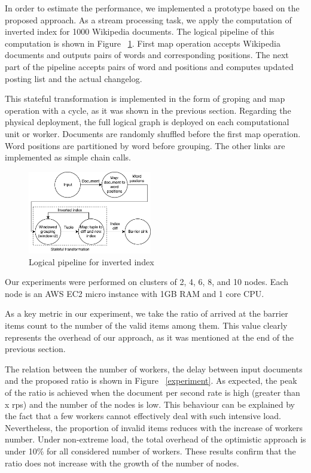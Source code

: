 
\label {fs-experiments}

In order to estimate the performance, we implemented a prototype based on the proposed approach. As a stream processing task, we apply the computation of inverted index for 1000 Wikipedia documents. The logical pipeline of this computation is shown in Figure ~\ref{inverted-index}. First map operation accepts Wikipedia documents and outputs pairs of words and corresponding positions. The next part of the pipeline accepts pairs of word and positions and computes updated posting list and the actual changelog. 

This stateful transformation is implemented in the form of groping and map operation with a cycle, as it was shown in the previous section. Regarding the physical deployment, the full logical graph is deployed on each computational unit or worker. Documents are randomly shuffled before the first map operation. Word positions are partitioned by word before grouping. The other links are implemented as simple chain calls.

\begin{figure}[htbp]
  \centering
  \includegraphics[width=0.48\textwidth]{pics/inverted-index}
  \caption{Logical pipeline for inverted index}
  \label {inverted-index}
\end{figure}

Our experiments were performed on clusters of 2, 4, 6, 8, and 10 nodes. Each node is an AWS EC2 micro instance with 1GB RAM and 1 core CPU.

As a key metric in our experiment, we take the ratio of arrived at the barrier items count to the number of the valid items among them. This value clearly represents the overhead of our approach, as it was mentioned at the end of the previous section. 

The relation between the number of workers, the delay between input documents and the proposed ratio is shown in Figure ~\ref{experiment}. As expected, the peak of the ratio is achieved when the document per second rate is high (greater than x rps) and the number of the nodes is low. This behaviour can be explained by the fact that a few workers cannot effectively deal with such intensive load. Nevertheless, the proportion of invalid items reduces with the increase of workers number. Under non-extreme load, the total overhead of the optimistic approach is under 10\% for all considered number of workers. These results confirm that the ratio does not increase with the growth of the number of nodes.

